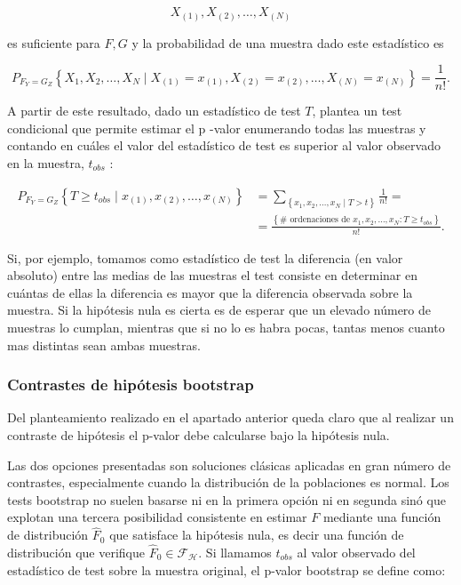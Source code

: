 \documentclass[
]{article}
\begin{document}
\[
X_{(1)}, X_{(2)}, \ldots, X_{(N)}
\]

es suficiente para \(F, G\) y la probabilidad de una muestra dado este estadístico es

\[
P_{F_{Y}=G_{Z}}\left\{X_{1}, X_{2}, \ldots, X_{N} \mid X_{(1)}=x_{(1)}, X_{(2)}=x_{(2)}, \ldots, X_{(N)}=x_{(N)}\right\}=\frac{1}{n!} .
\]

A partir de este resultado, dado un estadístico de test \(T\), plantea un test condicional que permite estimar el p -valor enumerando todas las muestras y contando en cuáles el valor del estadístico de test es superior al valor observado en la muestra, \(t_{o b s}\) :

\[
\begin{aligned}
P_{F_{Y}=G_{Z}}\left\{T \geq t_{o b s} \mid x_{(1)}, x_{(2)}, \ldots, x_{(N)}\right\} & =\sum_{\left\{x_{1}, x_{2}, \ldots, x_{N} \mid T>t\right\}} \frac{1}{n!}= \\
& =\frac{\left\{\# \text { ordenaciones de } x_{1}, x_{2}, \ldots, x_{N}: T \geq t_{o b s}\right\}}{n!} .
\end{aligned}
\]

Si, por ejemplo, tomamos como estadístico de test la diferencia (en valor absoluto) entre las medias de las muestras el test consiste en determinar en cuántas de ellas la diferencia es mayor que la diferencia observada sobre la muestra. Si la hipótesis nula es cierta es de esperar que un elevado número de muestras lo cumplan, mientras que si no lo es habra pocas, tantas menos cuanto mas distintas sean ambas muestras.

\subsubsection{Contrastes de hipótesis bootstrap}\label{contrastes-de-hipuxf3tesis-bootstrap}

Del planteamiento realizado en el apartado anterior queda claro que al realizar un contraste de hipótesis el p-valor debe calcularse bajo la hipótesis nula.

Las dos opciones presentadas son soluciones clásicas aplicadas en gran número de contrastes, especialmente cuando la distribución de la poblaciones es normal. Los tests bootstrap no suelen basarse ni en la primera opción ni en segunda sinó que explotan una tercera posibilidad consistente en estimar \(F\) mediante una función de distribución \(\hat{F}_{0}\) que satisface la hipótesis nula, es decir una función de distribución que verifique \(\hat{F}_{0} \in \mathcal{F}_{\mathcal{H}}\). Si llamamos \(t_{o b s}\) al valor observado del estadístico de test sobre la muestra original, el p-valor bootstrap se define como:
\end{document}
